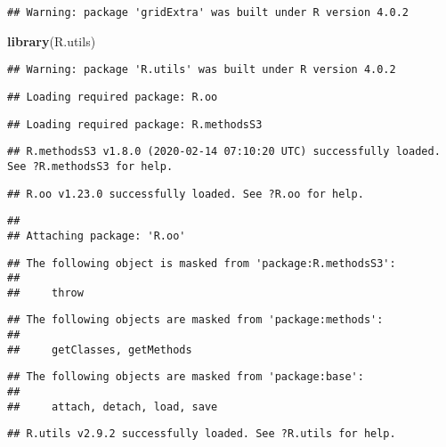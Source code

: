 \documentclass[
]{article}
\newenvironment{Shaded}{\begin{snugshade}}{\end{snugshade}}
\newcommand{\KeywordTok}[1]{\textcolor[rgb]{0.13,0.29,0.53}{\textbf{#1}}}
\newcommand{\NormalTok}[1]{#1}
\begin{document}
\begin{verbatim}
## Warning: package 'gridExtra' was built under R version 4.0.2
\end{verbatim}

\begin{Shaded}
\begin{Highlighting}[]
\KeywordTok{library}\NormalTok{(R.utils)}
\end{Highlighting}
\end{Shaded}

\begin{verbatim}
## Warning: package 'R.utils' was built under R version 4.0.2
\end{verbatim}

\begin{verbatim}
## Loading required package: R.oo
\end{verbatim}

\begin{verbatim}
## Loading required package: R.methodsS3
\end{verbatim}

\begin{verbatim}
## R.methodsS3 v1.8.0 (2020-02-14 07:10:20 UTC) successfully loaded. See ?R.methodsS3 for help.
\end{verbatim}

\begin{verbatim}
## R.oo v1.23.0 successfully loaded. See ?R.oo for help.
\end{verbatim}

\begin{verbatim}
## 
## Attaching package: 'R.oo'
\end{verbatim}

\begin{verbatim}
## The following object is masked from 'package:R.methodsS3':
## 
##     throw
\end{verbatim}

\begin{verbatim}
## The following objects are masked from 'package:methods':
## 
##     getClasses, getMethods
\end{verbatim}

\begin{verbatim}
## The following objects are masked from 'package:base':
## 
##     attach, detach, load, save
\end{verbatim}

\begin{verbatim}
## R.utils v2.9.2 successfully loaded. See ?R.utils for help.
\end{verbatim}
\end{document}
